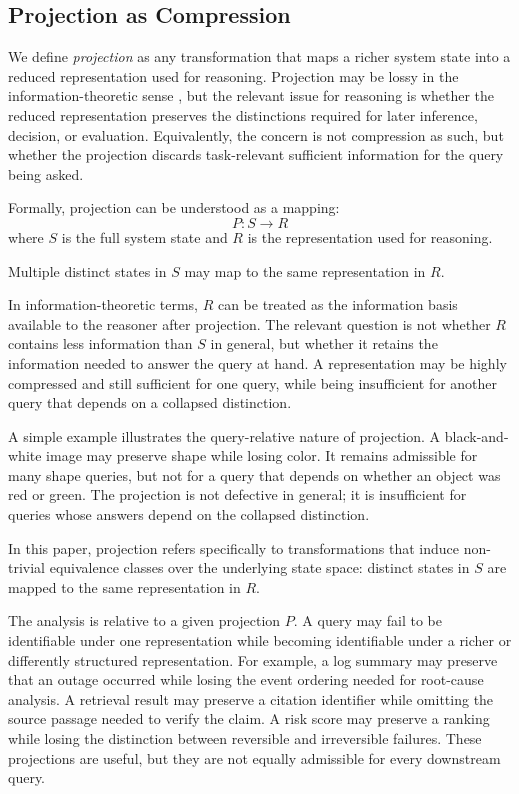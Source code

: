 \documentclass[11pt]{article}
\begin{document}
\subsection{Projection as Compression}

We define \emph{projection} as any transformation that maps a richer system state into a reduced representation used for reasoning. Projection may be lossy in the information-theoretic sense \cite{Shannon1948}, but the relevant issue for reasoning is whether the reduced representation preserves the distinctions required for later inference, decision, or evaluation. Equivalently, the concern is not compression as such, but whether the projection discards task-relevant sufficient information for the query being asked.

Formally, projection can be understood as a mapping:
\[
P: S \rightarrow R
\]
where $S$ is the full system state and $R$ is the representation used for reasoning.

Multiple distinct states in $S$ may map to the same representation in $R$.

In information-theoretic terms, $R$ can be treated as the information basis available to the reasoner after projection. The relevant question is not whether $R$ contains less information than $S$ in general, but whether it retains the information needed to answer the query at hand. A representation may be highly compressed and still sufficient for one query, while being insufficient for another query that depends on a collapsed distinction.

A simple example illustrates the query-relative nature of projection. A black-and-white image may preserve shape while losing color. It remains admissible for many shape queries, but not for a query that depends on whether an object was red or green. The projection is not defective in general; it is insufficient for queries whose answers depend on the collapsed distinction.

In this paper, projection refers specifically to transformations that induce non-trivial equivalence classes over the underlying state space: distinct states in $S$ are mapped to the same representation in $R$.

The analysis is relative to a given projection $P$. A query may fail to be identifiable under one representation while becoming identifiable under a richer or differently structured representation. For example, a log summary may preserve that an outage occurred while losing the event ordering needed for root-cause analysis. A retrieval result may preserve a citation identifier while omitting the source passage needed to verify the claim. A risk score may preserve a ranking while losing the distinction between reversible and irreversible failures. These projections are useful, but they are not equally admissible for every downstream query.
\end{document}
